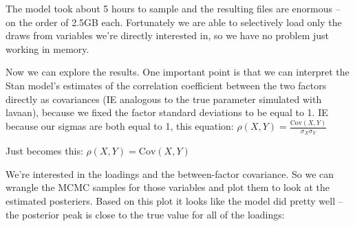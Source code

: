 \documentclass[
  letterpaper,
  DIV=11,
  numbers=noendperiod]{scrreprt}
\newenvironment{Shaded}{\begin{snugshade}}{\end{snugshade}}
\newcommand{\AttributeTok}[1]{\textcolor[rgb]{0.40,0.45,0.13}{#1}}
\newcommand{\CommentTok}[1]{\textcolor[rgb]{0.37,0.37,0.37}{#1}}
\newcommand{\FunctionTok}[1]{\textcolor[rgb]{0.28,0.35,0.67}{#1}}
\newcommand{\NormalTok}[1]{\textcolor[rgb]{0.00,0.23,0.31}{#1}}
\newcommand{\OtherTok}[1]{\textcolor[rgb]{0.00,0.23,0.31}{#1}}
\newcommand{\SpecialCharTok}[1]{\textcolor[rgb]{0.37,0.37,0.37}{#1}}
\newcommand{\StringTok}[1]{\textcolor[rgb]{0.13,0.47,0.30}{#1}}
\begin{document}
The model took about 5 hours to sample and the resulting files are
enormous -- on the order of 2.5GB each. Fortunately we are able to
selectively load only the draws from variables we're directly interested
in, so we have no problem just working in memory.

\begin{Shaded}
\end{Shaded}

Now we can explore the results. One important point is that we can
interpret the Stan model's estimates of the correlation coefficient
between the two factors directly as covariances (IE analogous to the
true parameter simulated with lavaan), because we fixed the factor
standard deviations to be equal to 1. IE because our sigmas are both
equal to 1, this equation:
\(\rho(X, Y) = \frac{\text{Cov}(X, Y)}{\sigma_X \sigma_Y}\)

Just becomes this: \(\rho(X, Y) = \text{Cov}(X, Y)\)

We're interested in the loadings and the between-factor covariance. So
we can wrangle the MCMC samples for those variables and plot them to
look at the estimated posteriers. Based on this plot it looks like the
model did pretty well -- the posterior peak is close to the true value
for all of the loadings:
\end{document}
